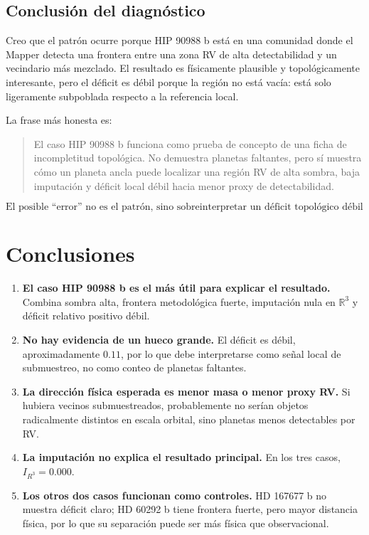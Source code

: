 \documentclass[11pt]{article}
\begin{document}
\subsection{Conclusión del diagnóstico}

Creo que el patrón ocurre porque HIP 90988 b está en una comunidad donde el Mapper detecta una frontera entre una zona RV de alta detectabilidad y un vecindario más mezclado. El resultado es físicamente plausible y topológicamente interesante, pero el déficit es débil porque la región no está vacía: está solo ligeramente subpoblada respecto a la referencia local.

La frase más honesta es:

\begin{quote}
El caso HIP 90988 b funciona como prueba de concepto de una ficha de incompletitud topológica. No demuestra planetas faltantes, pero sí muestra cómo un planeta ancla puede localizar una región RV de alta sombra, baja imputación y déficit local débil hacia menor proxy de detectabilidad.
\end{quote}

\[
\boxed{
\text{El posible ``error'' no es el patrón, sino sobreinterpretar un déficit topológico débil como descubrimiento astrofísico.}
}
\]
\section{Conclusiones}

\begin{enumerate}
    \item \textbf{El caso HIP 90988 b es el más útil para explicar el resultado.} Combina sombra alta, frontera metodológica fuerte, imputación nula en $\mathbb{R}^3$ y déficit relativo positivo débil.
    \item \textbf{No hay evidencia de un hueco grande.} El déficit es débil, aproximadamente $0.11$, por lo que debe interpretarse como señal local de submuestreo, no como conteo de planetas faltantes.
    \item \textbf{La dirección física esperada es menor masa o menor proxy RV.} Si hubiera vecinos submuestreados, probablemente no serían objetos radicalmente distintos en escala orbital, sino planetas menos detectables por RV.
    \item \textbf{La imputación no explica el resultado principal.} En los tres casos, $I_{R^3}=0.000$.
    \item \textbf{Los otros dos casos funcionan como controles.} HD 167677 b no muestra déficit claro; HD 60292 b tiene frontera fuerte, pero mayor distancia física, por lo que su separación puede ser más física que observacional.
\end{enumerate}
\end{document}

